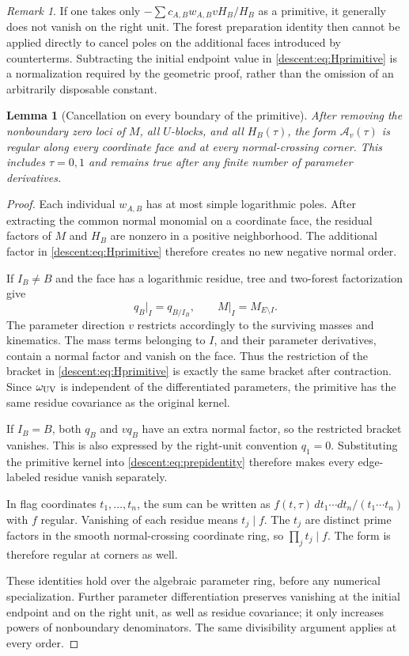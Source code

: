 \documentclass[11pt,a4paper,oneside]{article}
\theoremstyle{plain}
\newtheorem{lemma}[theorem]{Lemma}
\theoremstyle{definition}
\theoremstyle{remark}
\newtheorem{remark}[theorem]{Remark}
\numberwithin{equation}{section}
\begin{document}
\begin{remark}
If one takes only $-\sum c_{A,B}w_{A,B}vH_B/H_B$ as a primitive, it generally does not vanish on the right unit.
The forest preparation identity then cannot be applied directly to cancel poles on the additional faces introduced by counterterms.
Subtracting the initial endpoint value in \eqref{descent:eq:Hprimitive} is a normalization required by the geometric proof, rather than the omission of an arbitrarily disposable constant.
\end{remark}

\begin{lemma}[Cancellation on every boundary of the primitive]\label{descent:lem:cancel}
After removing the nonboundary zero loci of $M$, all $U$-blocks, and all $H_B(\tau)$, the form $\mathcal A_v(\tau)$ is regular along every coordinate face and at every normal-crossing corner.
This includes $\tau=0,1$ and remains true after any finite number of parameter derivatives.
\end{lemma}
\begin{proof}
Each individual $w_{A,B}$ has at most simple logarithmic poles.
After extracting the common normal monomial on a coordinate face, the residual factors of $M$ and $H_B$ are nonzero in a positive neighborhood. The additional factor in \eqref{descent:eq:Hprimitive} therefore creates no new negative normal order.

If $I_B\ne B$ and the face has a logarithmic residue, tree and two-forest factorization give
\[
 q_B\big|_I=q_{B/I_B},\qquad M\big|_I=M_{E\setminus I}.
\]
The parameter direction $v$ restricts accordingly to the surviving masses and kinematics.
The mass terms belonging to $I$, and their parameter derivatives, contain a normal factor and vanish on the face.
Thus the restriction of the bracket in \eqref{descent:eq:Hprimitive} is exactly the same bracket after contraction.
Since $\omega_{\rm UV}$ is independent of the differentiated parameters, the primitive has the same residue covariance as the original kernel.

If $I_B=B$, both $q_B$ and $vq_B$ have an extra normal factor, so the restricted bracket vanishes.
This is also expressed by the right-unit convention $q_1=0$.
Substituting the primitive kernel into \eqref{descent:eq:prepidentity} therefore makes every edge-labeled residue vanish separately.

In flag coordinates $t_1,\ldots,t_n$, the sum can be written as
$f(t,\tau)\,dt_1\cdots dt_n/(t_1\cdots t_n)$ with $f$ regular.
Vanishing of each residue means $t_j\mid f$.
The $t_j$ are distinct prime factors in the smooth normal-crossing coordinate ring, so $\prod_jt_j\mid f$.
The form is therefore regular at corners as well.

These identities hold over the algebraic parameter ring, before any numerical specialization.
Further parameter differentiation preserves vanishing at the initial endpoint and on the right unit, as well as residue covariance; it only increases powers of nonboundary denominators.
The same divisibility argument applies at every order.
\end{proof}
\end{document}
